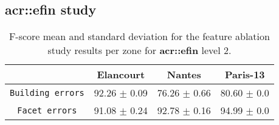         \FloatBarrier
    \subsection{\texorpdfstring{\acrlong*{acr::efin}}{eFin} study}
        \begin{table}[htbp]
            \centering
            \footnotesize
            \begin{tabular}{c c c c}
                \toprule
                & \textbf{Elancourt} & \textbf{Nantes} & \textbf{Paris-13}\\
                \midrule
                \texttt{Building errors} & 92.26 $\pm$ 0.09 & 76.26 $\pm$ 0.66 & 80.60 $\pm$ 0.0 \\
                \midrule
                \texttt{Facet errors} & 91.08 $\pm$ 0.24 & 92.78 $\pm$ 0.16 & 94.99 $\pm$ 0.0 \\
                \bottomrule
            \end{tabular}
            \caption{
                \label{tab::f_score_ablation_f2}
                F-score mean and standard deviation for the feature ablation study results per zone for \textbf{\gls{acr::efin}} level 2.
            }
        \end{table}

